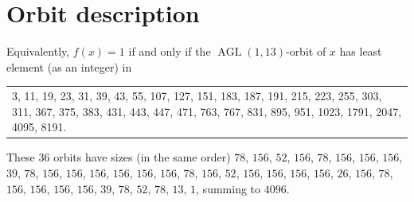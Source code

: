 \documentclass[11pt]{article}
\numberwithin{equation}{section}
\theoremstyle{definition}
\theoremstyle{remark}
\DeclareMathOperator{\AGL}{AGL}
\begin{document}
\section{Orbit description}\label{app:orbits}
Equivalently, $f(x)=1$ if and only if the $\AGL(1,13)$-orbit of $x$ has least element (as an integer) in
\begin{center}\small
\begin{tabular}{p{}}
3, 11, 19, 23, 31, 39, 43, 55, 107, 127, 151, 183, 187, 191, 215, 223, 255, 303, 311, 367, 375, 383,
431, 443, 447, 471, 763, 767, 831, 895, 951, 1023, 1791, 2047, 4095, 8191.
\end{tabular}
\end{center}
These $36$ orbits have sizes (in the same order) $78$, $156$, $52$, $156$, $78$, $156$, $156$, $156$, $39$, $78$,
$156$, $156$, $156$, $156$, $156$, $156$, $78$, $156$, $52$, $156$, $156$, $156$, $156$, $26$, $156$, $78$, $156$, $156$,
$156$, $156$, $39$, $78$, $52$, $78$, $13$, $1$, summing to $4096$.

{\small


}
\end{document}
